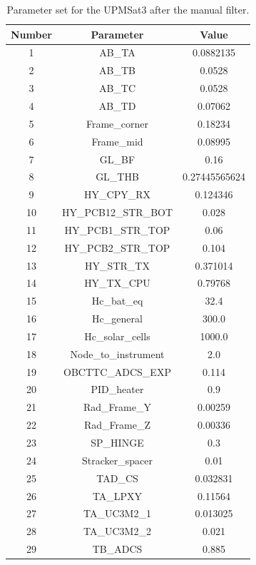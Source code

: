     
    \begin{table}[H]
        \centering
        \caption{Parameter set for the UPMSat3 after the manual filter.}
        \label{tab:manualfilterparamsUPMSat3}
    \begin{tabular}{ccc}
        \hline
        Number & Parameter & Value \\
        \hline
        1 & AB\_TA & 0.0882135 \\
        2 & AB\_TB & 0.0528 \\
        3 & AB\_TC & 0.0528 \\
        4 & AB\_TD & 0.07062 \\
        5 & Frame\_corner & 0.18234 \\
        6 & Frame\_mid & 0.08995 \\
        7 & GL\_BF & 0.16 \\
        8 & GL\_THB & 0.27445565624 \\
        9 & HY\_CPY\_RX & 0.124346 \\
        10 & HY\_PCB12\_STR\_BOT & 0.028 \\
        11 & HY\_PCB1\_STR\_TOP & 0.06 \\
        12 & HY\_PCB2\_STR\_TOP & 0.104 \\
        13 & HY\_STR\_TX & 0.371014 \\
        14 & HY\_TX\_CPU & 0.79768 \\
        15 & Hc\_bat\_eq & 32.4 \\
        16 & Hc\_general & 300.0 \\
        17 & Hc\_solar\_cells & 1000.0 \\
        18 & Node\_to\_instrument & 2.0 \\
        19 & OBCTTC\_ADCS\_EXP & 0.114 \\
        20 & PID\_heater & 0.9 \\
        21 & Rad\_Frame\_Y & 0.00259 \\
        22 & Rad\_Frame\_Z & 0.00336 \\
        23 & SP\_HINGE & 0.3 \\
        24 & Stracker\_spacer & 0.01 \\
        25 & TAD\_CS & 0.032831 \\
        26 & TA\_LPXY & 0.11564 \\
        27 & TA\_UC3M2\_1 & 0.013025 \\
        28 & TA\_UC3M2\_2 & 0.021 \\
        29 & TB\_ADCS & 0.885 \\

\end{tabular}
\end{table}
